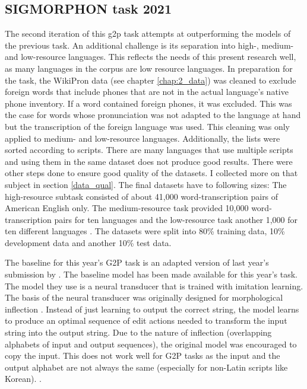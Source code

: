 \subsection{SIGMORPHON task 2021}
\label{sig21}
The second iteration of this \ac{g2p} task attempts at outperforming the models of the previous task. An additional challenge is its separation into high-, medium- and low-resource languages. This reflects the needs of this present research well, as many languages in the corpus are low resource languages. In preparation for the task, the WikiPron data (see chapter \ref{chap:2_data}) was cleaned to exclude foreign words that include phones that are not in the actual language's native phone inventory. If a word contained foreign phones, it was excluded. This was the case for words whose pronunciation was not adapted to the language at hand but the transcription of the foreign language was used. This cleaning was only applied to medium- and low-resource languages. Additionally, the lists were sorted according to scripts. There are many languages that use multiple scripts and using them in the same dataset does not produce good results. There were other steps done to ensure good quality of the datasets. I collected more on that subject in section \ref{data_qual}. 
The final datasets have to following sizes: The high-resource subtask consisted of about 41,000 word-transcription pairs of American English only. The medium-resource task provided 10,000 word-transcription pairs for ten languages and the low-resource task another 1,000 for ten different languages \citep{Ashby&Bartley.2021}. The datasets were split into 80\% training data, 10\% development data and another 10\% test data. 

The baseline for this year's G2P task is an adapted version of last year's submission by \citet{makarov-clematide-2020-cluzh}. The baseline model has been made available for this year's task. The model they use is a neural transducer that is trained with imitation learning. The basis of the neural transducer was originally designed for morphological inflection \citep{Aharoni&Goldberg.2016}. Instead of just learning to output the correct string, the model learns to produce an optimal sequence of edit actions needed to transform the input string into the output string. Due to the nature of inflection (overlapping alphabets of input and output sequences), the original model was encouraged to copy the input. This does not work well for G2P tasks as the input and the output alphabet are not always the same (especially for non-Latin scripts like Korean). . 

